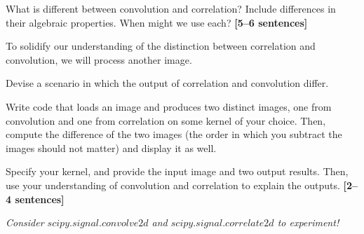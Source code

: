\documentclass{csci1430}
\begin{document}
\begin{subquestion}[points=3]
    What is different between convolution and correlation? Include differences in their algebraic properties. When might we use each? \textbf{[5--6 sentences]}
\end{subquestion}    
    
\begin{answer}[height=14]
    
\end{answer}
    
To solidify our understanding of the distinction between correlation and convolution, we will process another image.
    
\begin{subquestion}[points=4]
    Devise a scenario in which the output of correlation and convolution differ.
    
    Write code that loads an image and produces two distinct images, one from convolution and one from correlation on some kernel of your choice. Then, compute the difference of the two images (the order in which you subtract the images should not matter) and display it as well.
    
    Specify your kernel, and provide the input image and two output results. Then, use your understanding of convolution and correlation to explain the outputs. \textbf{[2--4 sentences]}
\end{subquestion}
    
\emph{Consider \href{https://docs.scipy.org/doc/scipy/reference/generated/scipy.signal.convolve2d.html}{$scipy.signal.convolve2d$} and \href{https://docs.scipy.org/doc/scipy/reference/generated/scipy.signal.correlate2d.html}{$scipy.signal.correlate2d$} to experiment!}
    
\end{document}
